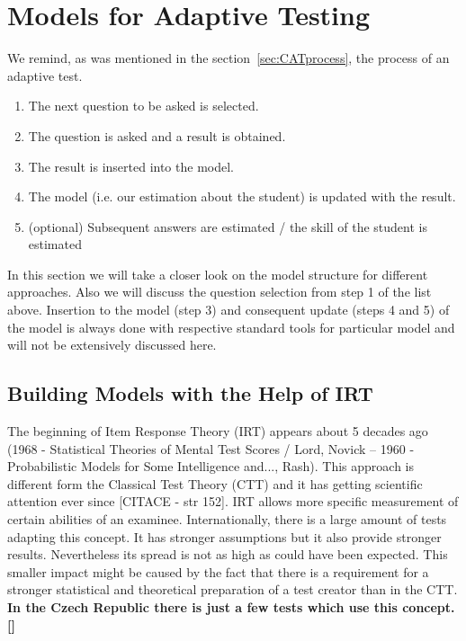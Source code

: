 \chapter{Models for Adaptive Testing}


We remind, as was mentioned in the section~\ref{sec:CATprocess}, the process of an adaptive test.
\begin{enumerate}
	\item The next question to be asked is selected.
	\item The question is asked and a result is obtained.
	\item The result is inserted into the model.
	\item The model (i.e. our estimation about the student) is updated with the result.
	\item (optional) Subsequent answers are estimated / the skill of the student is estimated
\end{enumerate}
In this section we will take a closer look on the model structure for different approaches. Also we will discuss the question selection from step 1 of the list above. Insertion to the model (step 3) and consequent update (steps 4 and 5) of the model is always done with respective standard tools for particular model and will not be extensively discussed here.

\section{Building Models with the Help of IRT}
\label{sec_IRT}
The beginning of Item Response Theory (IRT) appears about 5 decades ago (1968 - Statistical Theories of Mental Test Scores / Lord, Novick -- 1960 - Probabilistic Models for Some Intelligence and..., Rash). This approach is different form the Classical Test Theory (CTT) and it has getting scientific attention ever since [CITACE - str 152].  IRT allows more specific measurement of certain abilities of an examinee. Internationally, there is a large amount of tests adapting this concept. It has stronger assumptions but it also provide stronger results. Nevertheless its spread is not as high as could have been expected. This smaller impact might be caused by the fact that there is a requirement for a stronger statistical and theoretical preparation of a test creator than in the CTT. \textbf{In the Czech Republic there is just a few tests which use this concept. []} 

